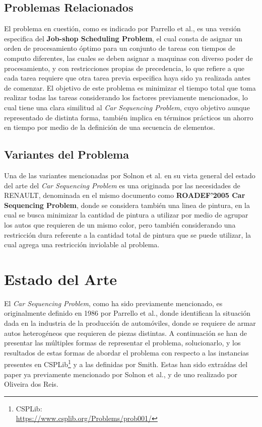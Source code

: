 \documentclass[letter, 10pt]{article}
\begin{document}
\subsection{Problemas Relacionados}
El problema en cuestión, como es indicado por Parrello et al., es una versión especifica del \textbf{Job-shop Scheduling Problem}, el cual consta de asignar un orden de procesamiento óptimo para un conjunto de tareas con tiempos de computo diferentes, las cuales se deben asignar a maquinas con diverso poder de procesamiento, y con restricciones propias de precedencia, lo que refiere a que cada tarea requiere que otra tarea previa especifica haya sido ya realizada antes de comenzar. El objetivo de este problema es minimizar el tiempo total que toma realizar todas las tareas considerando los factores previamente mencionados, lo cual tiene una clara similitud al \textit{Car Sequencing Problem}, cuyo objetivo aunque representado de distinta forma, también implica en términos prácticos un ahorro en tiempo por medio de la definición de una secuencia de elementos.

\subsection{Variantes del Problema}
Una de las variantes mencionadas por Solnon et al. en su vista general del estado del arte del \textit{Car Sequencing Problem} es una originada por las necesidades de RENAULT, denominada en el mismo documento como \textbf{ROADEF'2005 Car Sequencing Problem}, donde se considera también una linea de pintura, en la cual se busca minimizar la cantidad de pintura a utilizar por medio de agrupar los autos que requieren de un mismo color, pero también considerando una restricción dura referente a la cantidad total de pintura que se puede utilizar, la cual agrega una restricción inviolable al problema.



\section{Estado del Arte}
El \textit{Car Sequencing Problem}, como ha sido previamente mencionado, es originalmente definido en 1986 por Parrello et al., donde identifican la situación dada en la industria de la producción de automóviles, donde se requiere de armar autos heterogéneos que requieren de piezas distintas. A continuación se han de presentar las múltiples formas de representar el problema, solucionarlo, y los resultados de estas formas de abordar el problema con respecto a las instancias presentes en CSPLib\footnote{CSPLib:\\\url{https://www.csplib.org/Problems/prob001/}} y a las definidas por Smith\cite{Smith96succeed-firstor}. Estas han sido extraídas del paper ya previamente mencionado por Solnon et al., y de uno realizado por Oliveira dos Reis\cite{Oliveira_dos_Reis_2007}.
\end{document}
